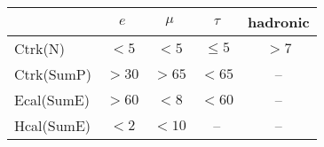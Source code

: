 \begin{tabular}{lcccc}
	\toprule
	 & $e$ & $\mu$ & $\tau$ & hadronic \\
	 \midrule
	Ctrk(N) & $<5$  & $<5$  & $\leq 5$ & $>7$ \\
	Ctrk(SumP) & $>30$ & $>65$ & $<65$ & --\\
	Ecal(SumE)  & $>60$ & $<8$  & $<60$ & -- \\
	Hcal(SumE)  & $<2$  & $<10$ & -- & -- \\
	\bottomrule
\end{tabular}